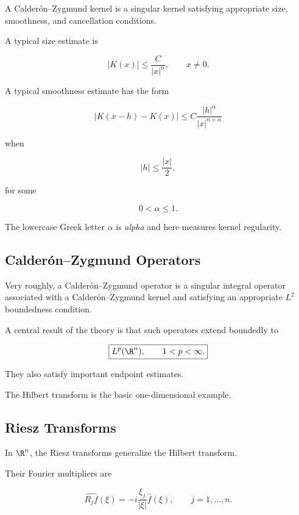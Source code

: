 A Calder\'on--Zygmund kernel is a singular kernel satisfying appropriate
size, smoothness, and cancellation conditions.

A typical size estimate is

\[
\boxed{
|K(x)|
\leq
\frac{C}{|x|^n},
\qquad
x\neq0.
}
\]

A typical smoothness estimate has the form

\[
\boxed{
|K(x-h)-K(x)|
\leq
C\frac{|h|^\alpha}{|x|^{n+\alpha}}
}
\]

when

\[
|h|
\leq
\frac{|x|}{2},
\]

for some

\[
0<\alpha\leq1.
\]

The lowercase Greek letter \(\alpha\) is \emph{alpha} and here measures
kernel regularity.

\subsection{Calder\'on--Zygmund Operators}
\label{subsec:calderon-zygmund-operators}

Very roughly, a Calder\'on--Zygmund operator is a singular integral
operator associated with a Calder\'on--Zygmund kernel and satisfying an
appropriate \(L^2\) boundedness condition.

A central result of the theory is that such operators extend boundedly to

\[
\boxed{
L^p(\R^n),
\qquad
1<p<\infty.
}
\]

They also satisfy important endpoint estimates.

The Hilbert transform is the basic one-dimensional example.

\subsection{Riesz Transforms}
\label{subsec:riesz-transforms}

In \(\R^n\), the Riesz transforms generalize the Hilbert transform.

Their Fourier multipliers are

\[
\boxed{
\widehat{R_jf}(\xi)
=
-i
\frac{\xi_j}{|\xi|}
\widehat{f}(\xi),
\qquad
j=1,\ldots,n.
}
\]


